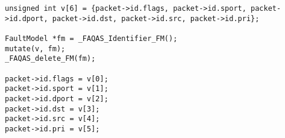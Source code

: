 
\begin{minipage}{16cm}
\begin{lstlisting}[style=CStyle, caption=Data-driven mutation example on libgscsp (csp\_io.c excerpt)., label=csp_integration]
unsigned int v[6] = {packet->id.flags, packet->id.sport, packet->id.dport, packet->id.dst, packet->id.src, packet->id.pri};

FaultModel *fm = _FAQAS_Identifier_FM();                                                                                          
mutate(v, fm);
_FAQAS_delete_FM(fm);

packet->id.flags = v[0];
packet->id.sport = v[1];
packet->id.dport = v[2]; 
packet->id.dst = v[3]; 
packet->id.src = v[4]; 
packet->id.pri = v[5]; 
\end{lstlisting}
\end{minipage}